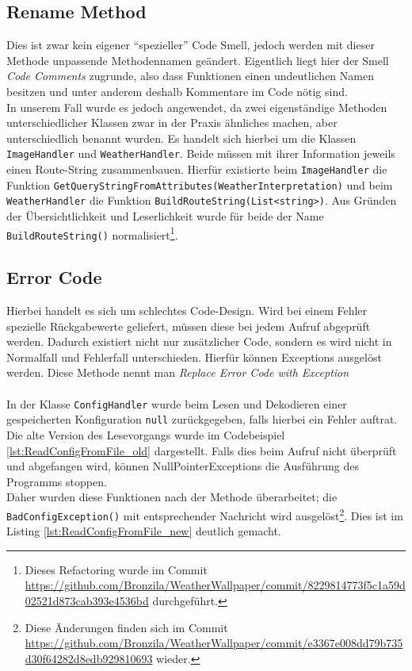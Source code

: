 \subsection{Rename Method}
Dies ist zwar kein eigener \enquote{spezieller} Code Smell, jedoch werden mit dieser Methode unpassende Methodennamen geändert.
Eigentlich liegt hier der Smell \textit{Code Comments} zugrunde, also dass Funktionen einen undeutlichen Namen besitzen und unter anderem deshalb Kommentare im Code nötig sind.\\

\noindent In unserem Fall wurde es jedoch angewendet, da zwei eigenständige Methoden unterschiedlicher Klassen zwar in der Praxis ähnliches machen, aber unterschiedlich benannt wurden.
Es handelt sich hierbei um die Klassen \texttt{ImageHandler} und \texttt{WeatherHandler}.
Beide müssen mit ihrer Information jeweils einen Route-String zusammenbauen.
Hierfür existierte beim \texttt{ImageHandler} die Funktion \texttt{GetQueryStringFromAttributes(WeatherInterpretation)} und beim \texttt{WeatherHandler} die Funktion \texttt{BuildRouteString(List<string>)}.
Aus Gründen der Übersichtlichkeit und Leserlichkeit wurde für beide der Name \texttt{BuildRouteString()} normalisiert\footnote{Dieses Refactoring wurde im Commit \url{https://github.com/Bronzila/WeatherWallpaper/commit/8229814773f5c1a59d02521d873cab393e4536bd} durchgeführt.}.

\subsection{Error Code}
Hierbei handelt es sich um schlechtes Code-Design. 
Wird bei einem Fehler spezielle Rückgabewerte geliefert, müssen diese bei jedem Aufruf abgeprüft werden.
Dadurch existiert nicht nur zusätzlicher Code, sondern es wird nicht in Normalfall und Fehlerfall unterschieden.
Hierfür können Exceptions ausgelöst werden.
Diese Methode nennt man \textit{Replace Error Code with Exception}\\
\\
In der Klasse \texttt{ConfigHandler} wurde beim Lesen und Dekodieren einer gespeicherten Konfiguration \texttt{null} zurückgegeben, falls hierbei ein Fehler auftrat. 
Die alte Version des Lesevorgangs wurde im Codebeispiel \ref{lst:ReadConfigFromFile_old} dargestellt.
Falls dies beim Aufruf nicht überprüft und abgefangen wird, können NullPointerExceptions die Ausführung des Programms stoppen.\\
Daher wurden diese Funktionen nach der Methode überarbeitet; die \texttt{BadConfigException()} mit entsprechender Nachricht wird ausgelöst\footnote{Diese Änderungen finden sich im Commit \url{https://github.com/Bronzila/WeatherWallpaper/commit/e3367e008dd79b735d30f64282d8edb929810693} wieder.}.
Dies ist im Listing \ref{lst:ReadConfigFromFile_new} deutlich gemacht.

